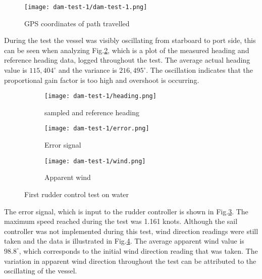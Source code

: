 
\begin{figure}[h!]
    \centering
    \texttt{[image: dam-test-1/dam-test-1.png]}
    \caption[Path travelled in first rudder control test]{GPS coordinates of path travelled}
    \label{fig:rudder-control-test-1-path}
\end{figure}

 
During the test the vessel was visibly oscillating from starboard to port side, this can be seen when analyzing Fig.\ref{subfig:first-rudder-control-heading}, which is a plot of the measured 
heading and reference heading data, logged throughout the test. The average actual heading value is $115,404^{\circ}$ and the variance is $216,495^{\circ}$. The oscillation indicates that 
the proportional gain factor is too high and overshoot is occurring. 

\begin{figure}[h!]
    \centering
    \begin{subfigure}{=0.75\linewidth}
        \centering
        \texttt{[image: dam-test-1/heading.png]}
        \caption{sampled and reference heading}
        \label{subfig:first-rudder-control-heading}
    \end{subfigure}

    \begin{subfigure}{=0.75\linewidth}
        \centering
        \texttt{[image: dam-test-1/error.png]}
        \caption{Error signal}
        \label{subfig:first-rudder-control-error}
    \end{subfigure}

    \begin{subfigure}{=0.75\linewidth}
        \centering
        \texttt{[image: dam-test-1/wind.png]}
        \caption{Apparent wind}
        \label{subfig:first-rudder-control-wind}
    \end{subfigure}

    \caption[First rudder control test on water]{First rudder control test on water}
    \label{fig:first-rudder-control-water}
\end{figure}


The error signal, which is input to the rudder 
controller is shown in Fig.\ref{subfig:first-rudder-control-error}. The maximum speed reached during the test was 1.161 knots. Although the sail controller was not implemented during this test, 
wind direction readings were still taken and the data is illustrated in Fig.\ref{subfig:first-rudder-control-wind}. The average apparent wind value is $98.8^{\circ}$, which corresponds to the initial 
wind direction reading that was taken. The variation in apparent wind direction throughout the test can be attributed to the oscillating of the vessel.

